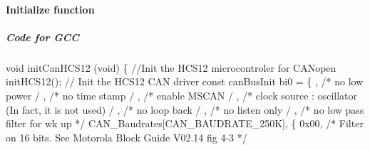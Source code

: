 \documentclass[a4paper,12pt]{book}
\newcommand{\canopen}{CANopen}
\begin{document}
\paragraph{Initialize function}
\subparagraph{Code for GCC}
{\ttfamily
void initCanHCS12 (void)\newline
 \{ \space \newline
  \space //Init the HCS12 microcontroler for \canopen{} \newline
  \space initHCS12();\newline
  \space \space // Init the HCS12 \space CAN driver\newline
  \space const canBusInit bi0 = \{\newline
  \space \space {}, \space \space \space /* no low power \space \space \space \space \space \space \space \space \space \space \space \space \space \space \space \space */
\newline
  \space \space {}, \space \space \space /* no time stamp
\space \space \space \space \space \space \space \space \space \space \space \space \space \space \space */\newline
  \space \space {}, \space \space \space /* enable MSCAN
\space \space \space \space \space \space \space \space \space \space \space \space \space \space \space \space */\newline
  \space \space {}, \space \space \space /* clock source : oscillator (In fact, it is not used)
\space \space */\newline
  \space \space {}, \space \space \space /* no loop back
\space \space \space \space \space \space \space \space \space \space \space \space \space \space \space \space */\newline
  \space \space {}, \space \space \space /* no listen only
\space \space \space \space \space \space \space \space \space \space \space \space \space \space */\newline
  \space \space {}, \space \space \space /* no low pass filter for wk up */\newline
  \space CAN\_Baudrates[CAN\_BAUDRATE\_250K],\newline
  \space \space \space \{\newline
  \space \space \space \space \space 0x00, \space \space \space /* Filter on 16 bits.\newline
  \space \space \space \space \space \space \space \space \space \space \space \space \space \space \space \space \space See Motorola Block Guide V02.14 fig
4{}-3 */\newline
}
\end{document}
